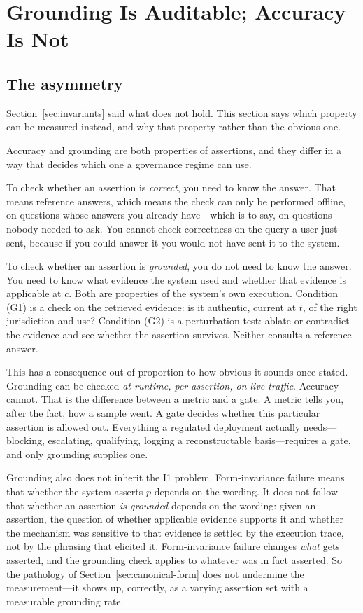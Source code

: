 \documentclass[11pt]{article}
\theoremstyle{plain}
\theoremstyle{definition}
\begin{document}
\section{Grounding Is Auditable; Accuracy Is Not}
\label{sec:auditable}

\subsection{The asymmetry}

Section~\ref{sec:invariants} said what does not hold. This section says which property
can be measured instead, and why that property rather than the obvious one.

Accuracy and grounding are both properties of assertions, and they differ in a way
that decides which one a governance regime can use.

To check whether an assertion is \emph{correct}, you need to know the answer.
That means reference answers, which means the check can only be performed offline, on
questions whose answers you already have---which is to say, on questions nobody
needed to ask. You cannot check correctness on the query a user just sent, because
if you could answer it you would not have sent it to the system.

To check whether an assertion is \emph{grounded}, you do not need to know the
answer. You need to know what evidence the system used and whether that evidence
is applicable at $c$. Both are properties of the system's own execution. Condition
(G1) is a check on the retrieved evidence: is it authentic, current at $t$, of
the right jurisdiction and use? Condition (G2) is a perturbation test: ablate or
contradict the evidence and see whether the assertion survives. Neither consults
a reference answer.

This has a consequence out of proportion to how obvious it sounds once stated.
Grounding can be checked \emph{at runtime, per assertion, on live traffic}.
Accuracy cannot. That is the difference between a metric and a gate. A metric
tells you, after the fact, how a sample went. A gate decides whether this
particular assertion is allowed out. Everything a regulated deployment actually
needs---blocking, escalating, qualifying, logging a reconstructable basis---requires
a gate, and only grounding supplies one.

Grounding also does not inherit the I1 problem. Form-invariance failure means that
whether the system asserts $p$ depends on the wording. It does not follow that
whether an assertion \emph{is grounded} depends on the wording: given an assertion,
the question of whether applicable evidence supports it and whether the mechanism
was sensitive to that evidence is settled by the execution trace, not by the
phrasing that elicited it. Form-invariance failure changes \emph{what} gets asserted,
and the grounding check applies to whatever was in fact asserted. So the pathology
of Section~\ref{sec:canonical-form} does not undermine the measurement---it shows
up, correctly, as a varying assertion set with a measurable grounding rate.
\end{document}
